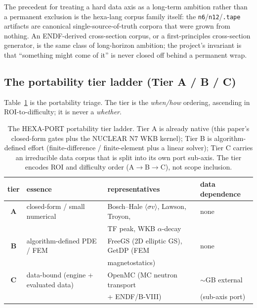The precedent for treating a hard data axis as a long-term ambition
rather than a permanent exclusion is the hexa-lang corpus family
itself: the \texttt{n6}/\texttt{n12}/\texttt{.tape} artifacts are
canonical single-source-of-truth corpora that were grown from nothing.
An ENDF-derived cross-section corpus, or a first-principles
cross-section generator, is the same class of long-horizon ambition;
the project's invariant is that ``something might come of it'' is never
closed off behind a permanent wrap.

\subsection{The portability tier ladder (Tier A / B / C)}
\label{app:hexaport:ladder}

Table~\ref{tab:app:hexaport:tiers} is the portability triage. The tier
is the \emph{when/how} ordering, ascending in ROI-to-difficulty; it is
never a \emph{whether}.

\begin{table}[h]
\centering
\small
\begin{tabular}{clll}
\toprule
tier & essence & representatives & data dependence \\
\midrule
\textbf{A} & closed-form / small numerical
  & Bosch--Hale $\langle\sigma v\rangle$, Lawson, Troyon,
    & none \\
  & & TF peak, WKB $\alpha$-decay & \\
\textbf{B} & algorithm-defined PDE / FEM
  & FreeGS (2D elliptic GS), GetDP (FEM & none \\
  & & magnetostatics) & \\
\textbf{C} & data-bound (engine + evaluated data)
  & OpenMC (MC neutron transport
    & $\sim$GB external \\
  & & + ENDF/B-VIII) & (sub-axis port) \\
\bottomrule
\end{tabular}
\caption{The HEXA-PORT portability tier ladder. Tier A is already
native (this paper's closed-form gates plus the NUCLEAR N7 WKB kernel);
Tier B is algorithm-defined effort (finite-difference / finite-element
plus a linear solver); Tier C carries an irreducible data corpus that
is split into its own port sub-axis. The tier encodes ROI and
difficulty order (A$\rightarrow$B$\rightarrow$C), not scope inclusion.}
\label{tab:app:hexaport:tiers}
\end{table}

